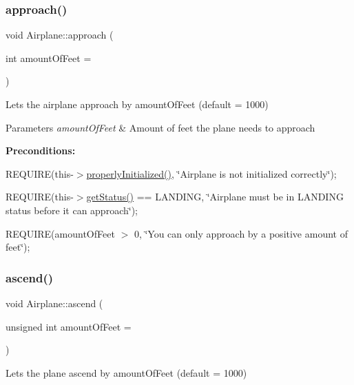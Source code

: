 \subsubsection{\texorpdfstring{approach()}{approach()}}
{\footnotesize\ttfamily void Airplane\+::approach (\begin{DoxyParamCaption}\item[{int}]{amount\+Of\+Feet = {} }\end{DoxyParamCaption})}



Lets the airplane approach by amount\+Of\+Feet (default = 1000) 


\begin{DoxyParams}{Parameters}
{\em amount\+Of\+Feet} & Amount of feet the plane needs to approach\\
\hline
\end{DoxyParams}
{\bfseries Preconditions\+:}
\begin{DoxyItemize}
\item R\+E\+Q\+U\+I\+RE(this-\/$>$\mbox{\hyperlink{class_airplane_a6f80df8f692cc8d67d292c1e9f26d59e}{properly\+Initialized()}}, \char`\"{}\+Airplane is not initialized correctly\char`\"{});
\item R\+E\+Q\+U\+I\+RE(this-\/$>$\mbox{\hyperlink{class_airplane_a35967a392b7274dc6a874bf3b73b7965}{get\+Status()}} == L\+A\+N\+D\+I\+NG, \char`\"{}\+Airplane must be in L\+A\+N\+D\+I\+N\+G status before it can approach\char`\"{});
\item R\+E\+Q\+U\+I\+RE(amount\+Of\+Feet $>$ 0, \char`\"{}\+You can only approach by a positive amount of feet\char`\"{}); 
\end{DoxyItemize}\mbox{\label{class_airplane_af9bad7ac84b24f462f564a4c8f21bfe0}} 
\subsubsection{\texorpdfstring{ascend()}{ascend()}}
{\footnotesize\ttfamily void Airplane\+::ascend (\begin{DoxyParamCaption}\item[{unsigned int}]{amount\+Of\+Feet = {} }\end{DoxyParamCaption})}



Lets the plane ascend by amount\+Of\+Feet (default = 1000) 



